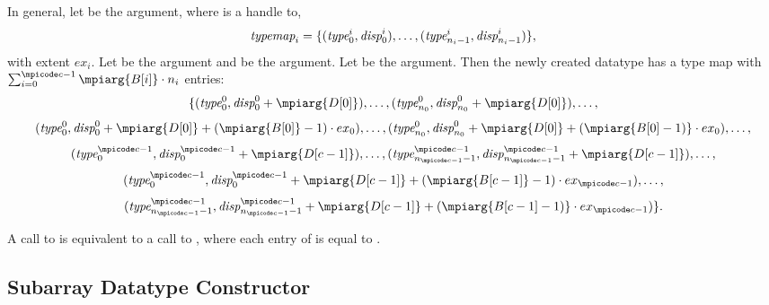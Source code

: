 In general,
let  be the  argument, where 
is a handle to,
\begin{displaymath}
\textrm{\itshape{typemap}}_i = \{ (\textrm{\itshape{type}}_0^i , \textrm{\itshape{disp}}_0^i ) , \ldots , (\textrm{\itshape{type}}_{n_{i}-1}^i ,
\textrm{\itshape{disp}}_{n_{i}-1}^i ) \} ,
\end{displaymath}
with extent $ex_i$.
Let
 be the  argument and  be
the  argument.  %
Let  be the
 argument.
Then the newly created datatype has a type map with
$\sum_{i=0}^{\mscode{c}-1}\mpiarg{B[i]} \cdot n_i$
entries:
\begin{displaymath}
\{
(\mword{type}_0^0 , \mword{disp}_0^0 +\mpiarg{D[0]}) , \ldots , (\mword{type}_{n_0}^0 , \mword{disp}_{n_0}^0 +
\mpiarg{D[0]} ) ,
\ldots ,
\end{displaymath}
\begin{displaymath}
(\mword{type}_0^0 , \mword{disp}_0^0 + \mpiarg{D[0]} + (\mpiarg{B[0]}-1) \cdot ex_0 ) , \ldots
,
(\mword{type}_{n_0}^0 , \mword{disp}_{n_0}^0 + \mpiarg{D[0]} + (\mpiarg{B[0]-1)} \cdot
ex_0 )
, \ldots ,
\end{displaymath}
\begin{displaymath}
(\mword{type}_0^{\mscode{c}-1} , \mword{disp}_0^{\mscode{c}-1} +\mpiarg{D[c-1]}) , \ldots ,
(\mword{type}_{{n_{\mscode{c}-1}}-1}^{\mscode{c}-1} ,
\mword{disp}_{{n_{\mscode{c}-1}}-1}^{\mscode{c}-1} + \mpiarg{D[c-1]} ) ,
\ldots ,
\end{displaymath}
\begin{displaymath}
(\mword{type}_0^{\mscode{c}-1} , \mword{disp}_0^{\mscode{c}-1} +
\mpiarg{D[c-1]} + (\mpiarg{B[c-1]}-1) \cdot ex_{\mscode{c}-1} ) ,
\ldots ,
\end{displaymath}
\begin{displaymath}
(\mword{type}_{{n_{\mscode{c}-1}}-1}^{\mscode{c}-1} ,
\mword{disp}_{{n_{\mscode{c}-1}}-1}^{\mscode{c}-1} + \mpiarg{D[c-1]} +
(\mpiarg{B[c-1]-1)} \cdot ex_{\mscode{c}-1} )
\} .
\end{displaymath}

A call to
is equivalent to a call to
,
where each entry of  is equal to .

\subsection{Subarray Datatype Constructor}
\label{sec:io-const-array}

